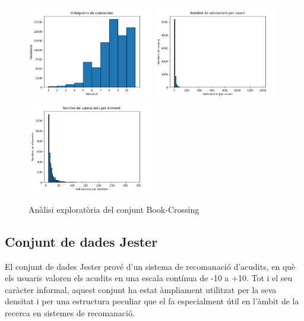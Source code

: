\documentclass[a4paper,12pt]{report}
\begin{document}
\begin{figure}[H]
    \centering
    \includegraphics[width=0.49\textwidth]{Figuras/books-ratings.png}
    \hfill
    \includegraphics[width=0.49\textwidth]{Figuras/books-users.png}
    \hfill
    \includegraphics[width=0.49\textwidth]{Figuras/books-items.png}
    \caption{Anàlisi exploratòria del conjunt Book-Crossing}
    \label{fig:analisis_books}
\end{figure}

\subsection{Conjunt de dades Jester}

El conjunt de dades Jester \cite{jesterdataset,goldberg2001eigentaste} prové d’un sistema de recomanació d’acudits, en què els usuaris valoren els acudits en una escala contínua de -10 a +10. Tot i el seu caràcter informal, aquest conjunt ha estat àmpliament utilitzat per la seva densitat i per una estructura peculiar que el fa especialment útil en l’àmbit de la recerca en sistemes de recomanació.
\end{document}
